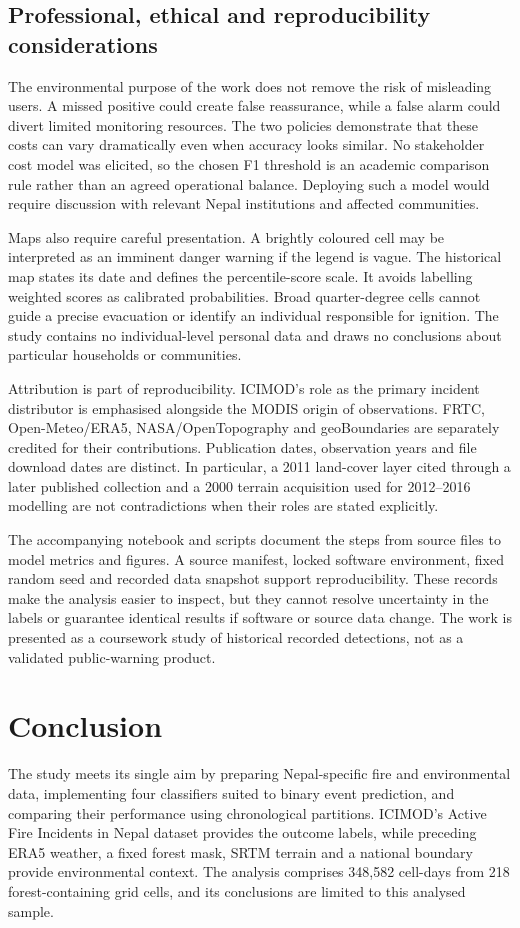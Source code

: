 \documentclass[conference,a4paper]{IEEEtran}
\begin{document}
\subsection{Professional, ethical and reproducibility considerations}
The environmental purpose of the work does not remove the risk of misleading users. A missed positive could create false reassurance, while a false alarm could divert limited monitoring resources. The two policies demonstrate that these costs can vary dramatically even when accuracy looks similar. No stakeholder cost model was elicited, so the chosen F1 threshold is an academic comparison rule rather than an agreed operational balance. Deploying such a model would require discussion with relevant Nepal institutions and affected communities.

Maps also require careful presentation. A brightly coloured cell may be interpreted as an imminent danger warning if the legend is vague. The historical map states its date and defines the percentile-score scale. It avoids labelling weighted scores as calibrated probabilities. Broad quarter-degree cells cannot guide a precise evacuation or identify an individual responsible for ignition. The study contains no individual-level personal data and draws no conclusions about particular households or communities.

Attribution is part of reproducibility. ICIMOD's role as the primary incident distributor is emphasised alongside the MODIS origin of observations. FRTC, Open-Meteo/ERA5, NASA/OpenTopography and geoBoundaries are separately credited for their contributions. Publication dates, observation years and file download dates are distinct. In particular, a 2011 land-cover layer cited through a later published collection and a 2000 terrain acquisition used for 2012--2016 modelling are not contradictions when their roles are stated explicitly.

The accompanying notebook and scripts document the steps from source files to model metrics and figures. A source manifest, locked software environment, fixed random seed and recorded data snapshot support reproducibility. These records make the analysis easier to inspect, but they cannot resolve uncertainty in the labels or guarantee identical results if software or source data change. The work is presented as a coursework study of historical recorded detections, not as a validated public-warning product.

\section{Conclusion}
The study meets its single aim by preparing Nepal-specific fire and environmental data, implementing four classifiers suited to binary event prediction, and comparing their performance using chronological partitions. ICIMOD’s Active Fire Incidents in Nepal dataset provides the outcome labels, while preceding ERA5 weather, a fixed forest mask, SRTM terrain and a national boundary provide environmental context. The analysis comprises 348,582 cell-days from 218 forest-containing grid cells, and its conclusions are limited to this analysed sample.
\end{document}
